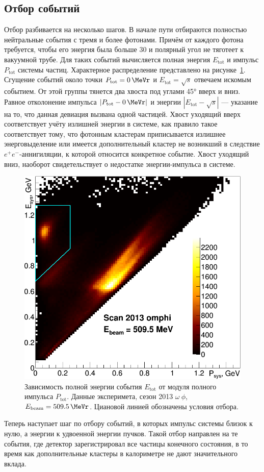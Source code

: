 \subsection{Отбор событий}

Отбор разбивается на несколько шагов. В начале пути отбираются полностью нейтральные события с тремя и более фотонами.
Причём от каждого фотона требуется, чтобы его энергия была больше \SI{30}{\MeVr} и полярный угол не тяготеет к вакуумной трубе.
Для таких событий вычисляется полная энергия $E_{\text{tot}}$ и импульс $P_{\text{tot}}$ системы частиц.
Характерное распределение представлено на рисунке~\ref{fig:EtvsPt5095}.
Сгущение событий около точки $P_{\text{tot}} = \SI{0}{\MeVr}$ и $E_{\text{tot}} = \sqrt{s}$ отвечаем искомым событием.
От этой группы тянется два хвоста под углами \ang{45} вверх и вниз.
Равное отколонение импульса $|P_{\text{tot}} - \SI{0}{\MeVr}|$ и энергии $|E_{\text{tot}} - \sqrt{s}|$
---
указание на то,
что данная девиация вызвана одной частицей.
Хвост уходящий вверх соответствует учёту излишней энергии в системе,
как правило такое соответствует тому,
что фотонным кластерам приписывается излишнее энерговыделение или имеется дополнительный кластер не возникший в следствие $e^+e^-$-аннигиляции,
к которой относится конкретное событие.
Хвост уходящий вниз, наоборот свидетельствует о недостатке энергии-импульса в системе.

\begin{figure}
	\centering
	\label{fig:EtvsPt5095}
	\includegraphics[width=.5\textwidth]{img/EtvsPt5095.png}
	\caption{Зависимость полной энергии события $E_{\text{tot}}$ от модуля полного импульса $P_{\text{tot}}$.
		Данные эксперимета, сезон 2013 $\omega \ \phi$, $E_{\text{beam}} = \SI{509.5}{\MeVr}$.
		Циановой линией обозначены условия отбора.}
\end{figure}

Теперь наступает шаг по отбору событий, в которых импульс системы близок к нулю,
а энергии к удвоенной энергии пучков.
Такой отбор направлен на те события,
где детектор зарегистрировал все частицы конечного состояния,
в то время как дополнительные кластеры в калориметре не дают значительного вклада.

